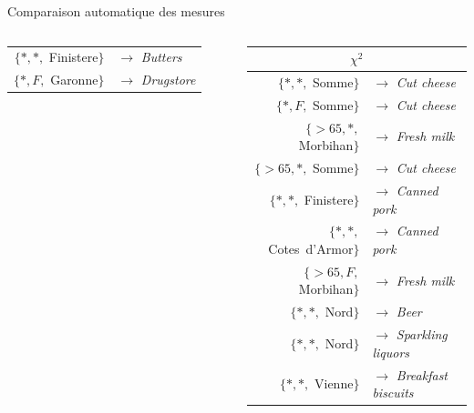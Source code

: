 \documentclass[table]{beamer}
\begin{document}
\begin{frame}[t]{Comparaison automatique des mesures}
\begin{scriptsize}
{\begin{columns}[c]
\begin{tabular}{|rl|}
            $\{*, *, $ Finistere$\}$&$\rightarrow$ {\em Butters}       \\
            $\{*, F, $ Garonne$\}$&$\rightarrow$ {\em Drugstore}          \\\hline
          \end{tabular}
        \begin{tabular}{|rl|}
        \hline
        \multicolumn{2}{|c|}{\textbf{$\chi^2$}}      \\\hline
        $\{*, *, $ Somme$\}$&$\rightarrow$ {\em Cut cheese}       \\
         $\{*, F, $ Somme$\}$&$\rightarrow$ {\em Cut cheese}       \\
        $\{> 65, *,$ Morbihan$\}$&$\rightarrow$ {\em Fresh milk}       \\
        $\{> 65, *,$ Somme$\}$&$\rightarrow$ {\em Cut cheese}       \\
        $\{*, *,$ Finistere$\}$&$\rightarrow$ {\em Canned pork}       \\
        $\{*, *,$ Cotes\ d'Armor$\}$&$\rightarrow$ {\em Canned pork}       \\
        $\{> 65, F,$ Morbihan$\}$&$\rightarrow$ {\em Fresh milk}       \\
        $\{*, *,$ Nord$\}$&$\rightarrow$ {\em Beer}       \\
        $\{*, *,$ Nord$\}$&$\rightarrow$ {\em Sparkling liquors}       \\
        $\{*, *,$ Vienne$\}$&$\rightarrow$ {\em Breakfast biscuits}   \\\hline
        \end{tabular}
    \end{columns}
  }
  \end{scriptsize}



\end{frame}
\end{document}
